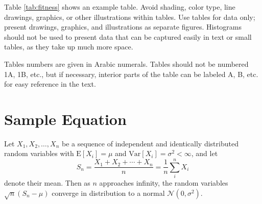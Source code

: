 \documentclass[9pt,twocolumn,twoside,lineno]{gsajnl}
\begin{document}
Table \ref{tab:fitness} shows an example table. Avoid shading, color type, line drawings, graphics, or other illustrations within tables. Use tables for data only; present drawings, graphics, and illustrations as separate figures. Histograms should not be used to present data that can be captured easily in text or small tables, as they take up much more space.  

Tables numbers are given in Arabic numerals. Tables should not be numbered 1A, 1B, etc., but if necessary, interior parts of the table can be labeled A, B, etc. for easy reference in the text.  



\section{Sample Equation}

Let $X_1, X_2, \ldots, X_n$ be a sequence of independent and identically distributed random variables with $\text{E}[X_i] = \mu$ and $\text{Var}[X_i] = \sigma^2 < \infty$, and let
\begin{equation}
S_n = \frac{X_1 + X_2 + \cdots + X_n}{n}
      = \frac{1}{n}\sum_{i}^{n} X_i
\label{eq:refname1}
\end{equation}
denote their mean. Then as $n$ approaches infinity, the random variables $\sqrt{n}(S_n - \mu)$ converge in distribution to a normal $\mathcal{N}(0, \sigma^2)$.


\end{document}
